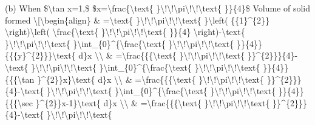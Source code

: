 (b) When \$\textbackslash tan x=1,\$ \$x=\textbackslash frac\{\textbackslash text\{
\}\textbackslash !\textbackslash !\textbackslash pi\textbackslash !\textbackslash !\textbackslash text\{
\}\}\{4\}\$ Volume of solid formed \textbackslash{[}\textbackslash begin\{align\}
\& =\textbackslash text\{ \}\textbackslash !\textbackslash !\textbackslash pi\textbackslash !\textbackslash !\textbackslash text\{
\}\textbackslash left( \{\{1\}\textasciicircum\{2\}\} \textbackslash right)\textbackslash left(
\textbackslash frac\{\textbackslash text\{ \}\textbackslash !\textbackslash !\textbackslash pi\textbackslash !\textbackslash !\textbackslash text\{
\}\}\{4\} \textbackslash right)-\textbackslash text\{ \}\textbackslash !\textbackslash !\textbackslash pi\textbackslash !\textbackslash !\textbackslash text\{
\}\textbackslash int\_\{0\}\textasciicircum\{\textbackslash frac\{\textbackslash text\{
\}\textbackslash !\textbackslash !\textbackslash pi\textbackslash !\textbackslash !\textbackslash text\{
\}\}\{4\}\}\{\{\{y\}\textasciicircum\{2\}\}\}\textbackslash text\{
d\}x \textbackslash\textbackslash{} \& =\textbackslash frac\{\{\{\textbackslash text\{
\}\textbackslash !\textbackslash !\textbackslash pi\textbackslash !\textbackslash !\textbackslash text\{
\}\}\textasciicircum\{2\}\}\}\{4\}-\textbackslash text\{ \}\textbackslash !\textbackslash !\textbackslash pi\textbackslash !\textbackslash !\textbackslash text\{
\}\textbackslash int\_\{0\}\textasciicircum\{\textbackslash frac\{\textbackslash text\{
\}\textbackslash !\textbackslash !\textbackslash pi\textbackslash !\textbackslash !\textbackslash text\{
\}\}\{4\}\}\{\{\{\textbackslash tan \}\textasciicircum\{2\}\}x\}\textbackslash text\{
d\}x \textbackslash\textbackslash{} \& =\textbackslash frac\{\{\{\textbackslash text\{
\}\textbackslash !\textbackslash !\textbackslash pi\textbackslash !\textbackslash !\textbackslash text\{
\}\}\textasciicircum\{2\}\}\}\{4\}-\textbackslash text\{ \}\textbackslash !\textbackslash !\textbackslash pi\textbackslash !\textbackslash !\textbackslash text\{
\}\textbackslash int\_\{0\}\textasciicircum\{\textbackslash frac\{\textbackslash text\{
\}\textbackslash !\textbackslash !\textbackslash pi\textbackslash !\textbackslash !\textbackslash text\{
\}\}\{4\}\}\{\{\{\textbackslash sec \}\textasciicircum\{2\}\}x-1\}\textbackslash text\{
d\}x \textbackslash\textbackslash{} \& =\textbackslash frac\{\{\{\textbackslash text\{
\}\textbackslash !\textbackslash !\textbackslash pi\textbackslash !\textbackslash !\textbackslash text\{
\}\}\textasciicircum\{2\}\}\}\{4\}-\textbackslash text\{ \}\textbackslash !\textbackslash !\textbackslash pi\textbackslash !\textbackslash !\textbackslash text\{
